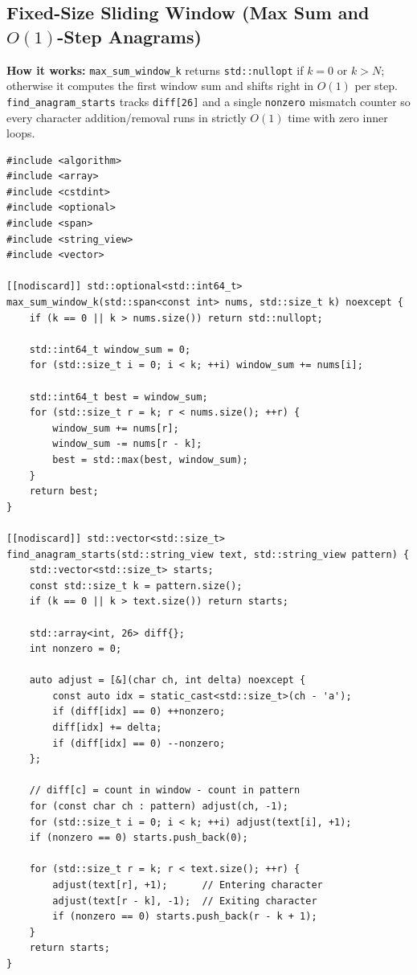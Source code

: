 \documentclass[11pt,a4paper]{article}
\theoremstyle{definition}
\begin{document}
\subsection{Fixed-Size Sliding Window (Max Sum and $O(1)$-Step Anagrams)}

\textbf{How it works:} \texttt{max\_sum\_window\_k} returns \texttt{std::nullopt} if $k = 0$ or $k > N$; otherwise it computes the first window sum and shifts right in $O(1)$ per step. \texttt{find\_anagram\_starts} tracks \texttt{diff[26]} and a single \texttt{nonzero} mismatch counter so every character addition/removal runs in strictly $O(1)$ time with zero inner loops.

\begin{lstlisting}[caption={Fixed-size window maximum sum and $O(N)$ lowercase anagram search.}]
#include <algorithm>
#include <array>
#include <cstdint>
#include <optional>
#include <span>
#include <string_view>
#include <vector>

[[nodiscard]] std::optional<std::int64_t>
max_sum_window_k(std::span<const int> nums, std::size_t k) noexcept {
    if (k == 0 || k > nums.size()) return std::nullopt;

    std::int64_t window_sum = 0;
    for (std::size_t i = 0; i < k; ++i) window_sum += nums[i];

    std::int64_t best = window_sum;
    for (std::size_t r = k; r < nums.size(); ++r) {
        window_sum += nums[r];
        window_sum -= nums[r - k];
        best = std::max(best, window_sum);
    }
    return best;
}

[[nodiscard]] std::vector<std::size_t>
find_anagram_starts(std::string_view text, std::string_view pattern) {
    std::vector<std::size_t> starts;
    const std::size_t k = pattern.size();
    if (k == 0 || k > text.size()) return starts;

    std::array<int, 26> diff{};
    int nonzero = 0;

    auto adjust = [&](char ch, int delta) noexcept {
        const auto idx = static_cast<std::size_t>(ch - 'a');
        if (diff[idx] == 0) ++nonzero;
        diff[idx] += delta;
        if (diff[idx] == 0) --nonzero;
    };

    // diff[c] = count in window - count in pattern
    for (const char ch : pattern) adjust(ch, -1);
    for (std::size_t i = 0; i < k; ++i) adjust(text[i], +1);
    if (nonzero == 0) starts.push_back(0);

    for (std::size_t r = k; r < text.size(); ++r) {
        adjust(text[r], +1);      // Entering character
        adjust(text[r - k], -1);  // Exiting character
        if (nonzero == 0) starts.push_back(r - k + 1);
    }
    return starts;
}
\end{lstlisting}
\end{document}
